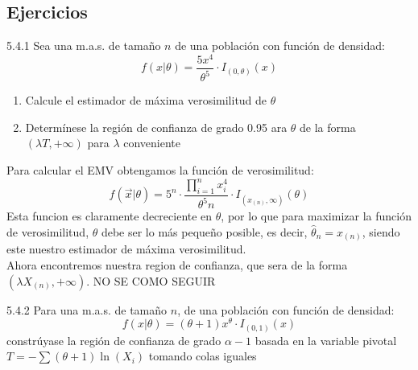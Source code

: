 \subsection{Ejercicios}
\begin{problem}{5.4.1}    Sea una m.a.s. de tamaño $n$ de una población con función de densidad: 
    $$f(x | \theta) = \frac{5x^4}{\theta^5} \cdot I_{(0, \theta)}(x)$$
    \begin{enumerate}
        \item Calcule el estimador de máxima verosimilitud de $\theta$
        \item Determínese la región de confianza de grado 0.95 ara $\theta$ de la forma $(\lambda  T, +\infty)$ para $\lambda$ conveniente
    \end{enumerate}
\end{problem}
\begin{sol}
    Para calcular el EMV obtengamos la función de verosimilitud:
    $$ f(\vec{x} | \theta) = 5^n \cdot \frac{\prod_{i=1}^{n}x_i^4}{\theta^5n} \cdot I_{(x_{(n)}, \infty)}(\theta)$$ 
    Esta funcion es claramente decreciente en $\theta$, por lo que para maximizar la función de verosimilitud, $\theta$ debe ser lo más pequeño posible, es decir, $\hat{\theta}_{n} = x_{(n)}$, siendo este nuestro estimador de máxima verosimilitud. \\
    Ahora encontremos nuestra region de confianza, que sera de la forma $(\lambda X_{(n)}, +\infty)$.
    NO SE COMO SEGUIR
\end{sol}
\begin{problem}{5.4.2}
    Para una m.a.s. de tamaño $n$, de una población con función de densidad: 
    $$f(x | \theta) = (\theta + 1)x^{\theta} \cdot I_{(0, 1)}(x)$$
    constrúyase la región de confianza de grado $\alpha -1$ basada en la variable pivotal $T= -\sum (\theta +1)\ln(X_i)$ tomando colas iguales
\end{problem}
